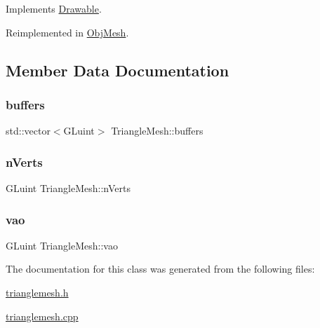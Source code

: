 Implements \mbox{\hyperlink{class_drawable_a773dfc1e1dc02e4156204af3939d04d1}{Drawable}}.



Reimplemented in \mbox{\hyperlink{class_obj_mesh_a735d4c7978094b8ba07cd720e496ea60}{Obj\+Mesh}}.



\subsection{Member Data Documentation}
\mbox{\label{class_triangle_mesh_a6b4667d53b613e80bd39bb007c5988b6}} 
\subsubsection{\texorpdfstring{buffers}{buffers}}
{\footnotesize\ttfamily std\+::vector$<$G\+Luint$>$ Triangle\+Mesh\+::buffers\hspace{0.3cm}{\ttfamily [protected]}}

\mbox{\label{class_triangle_mesh_a5775b5f33a2dc1b758b7e5c9be50a2ab}} 
\subsubsection{\texorpdfstring{nVerts}{nVerts}}
{\footnotesize\ttfamily G\+Luint Triangle\+Mesh\+::n\+Verts\hspace{0.3cm}{\ttfamily [protected]}}

\mbox{\label{class_triangle_mesh_a51f91c0f3126061cd7f1fa71a1cc09b1}} 
\subsubsection{\texorpdfstring{vao}{vao}}
{\footnotesize\ttfamily G\+Luint Triangle\+Mesh\+::vao\hspace{0.3cm}{\ttfamily [protected]}}



The documentation for this class was generated from the following files\+:\begin{DoxyCompactItemize}
\item 
\mbox{\hyperlink{trianglemesh_8h}{trianglemesh.\+h}}\item 
\mbox{\hyperlink{trianglemesh_8cpp}{trianglemesh.\+cpp}}\end{DoxyCompactItemize}

